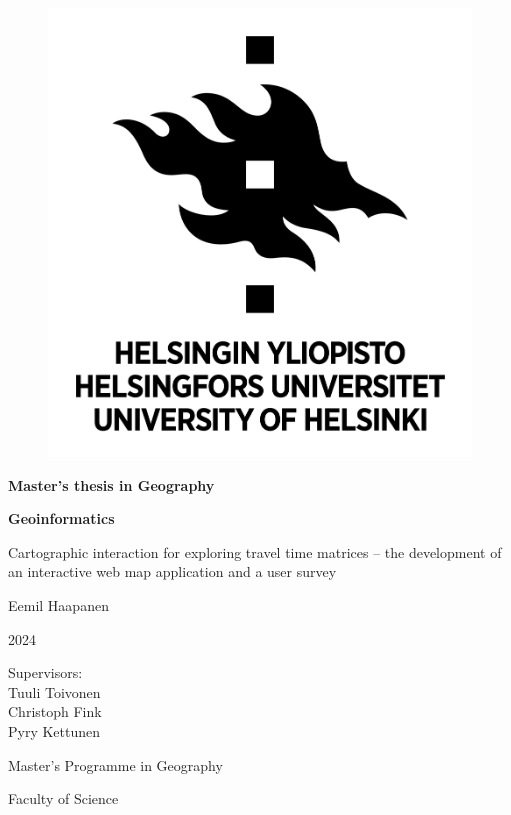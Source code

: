 \newcommand{\mytitle}{%
Cartographic interaction for exploring travel time matrices --
the development of an interactive web map application and a user survey
}
\newcommand{\myfinnishtitle}{%
Kartografinen vuorovaikutus matka-aikamatriisien visualisoinnissa --
interaktiivisen verkkokarttasovelluksen kehitys sekä käyttäjäkysely
}

\begin{center}{
    \begin{figure}[H]
        \centering
        \includegraphics[scale=0.4]{visual/other/helsinki_uni_logo.jpg}
    \end{figure}

    \bigskip
    \bigskip
    \bigskip
    \textbf{Master's thesis in Geography} \par
    \textbf{Geoinformatics} \par

    \bigskip
    \bigskip
    \mytitle

    \bigskip
    \bigskip
    Eemil Haapanen

    2024

    \vfill

    Supervisors: \\
    Tuuli Toivonen \\
    Christoph Fink \\
    Pyry Kettunen \par
    \bigskip
    \bigskip
    \bigskip
    Master's Programme in Geography \par
    Faculty of Science \par
}
\end{center}
